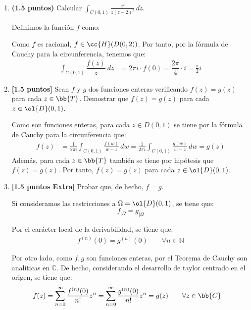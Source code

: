 \documentclass[12pt]{article}
\begin{document}
    \begin{ejercicio}~
        \begin{enumerate}
            \item \textbf{(1.5 puntos)} Calcular $\displaystyle \int_{C(0,1)} \frac{e^z}{z(z - 2)^2} \, dz$.
            
            Definimos la función $f$ como:

            Como $f$ es racional, $f\in \cc{H}(D(0,2))$. Por tanto, por la fórmula de Cauchy para la circunferencia, tenemos que:
            \begin{align*}
                \int_{C(0,1)} \dfrac{f(z)}{z}\ dz &= 2\pi i \cdot f(0)=\dfrac{2\pi}{4}\cdot i = \frac{\pi}{2} i
            \end{align*}
            \item \textbf{[1.5 puntos]} Sean $f$ y $g$ dos funciones enteras verificando $f(z) = g(z)$ para cada $z \in \bb{T}$. Demostrar que $f(z) = g(z)$ para cada $z \in \ol{D}(0, 1)$.
            
            Como son funciones enteras, para cada $z\in D(0,1)$ se tiene por la fórmula de Cauchy para la circunferencia que:
            \begin{align*}
                f(z) &= \frac{1}{2\pi i} \int_{C(0,1)} \frac{f(w)}{w-z} \, dw
                = \frac{1}{2\pi i} \int_{C(0,1)} \frac{g(w)}{w-z} \, dw
                = g(z)
            \end{align*}
            Además, para cada $z\in \bb{T}$ también se tiene por hipótesis que $f(z)=g(z)$. Por tanto, $f(z)=g(z)$ para cada $z\in \ol{D}(0,1)$.
            \item \textbf{[1.5 puntos Extra]} Probar que, de hecho, $f = g$.
            
            Si consideramos las restricciones a $\Omega=\ol{D}(0,1)$, se tiene que:
            \begin{equation*}
                f_{\big| \Omega} = g_{\big| \Omega}
            \end{equation*}

            Por el carácter local de la derivabilidad, se tiene que:
            \begin{align*}
                f^{(n)}(0) = g^{(n)}(0) \qquad \forall n\in \mathbb{N}
            \end{align*}

            Por otro lado, como $f,g$ son funciones enteras, por el Teorema de Cauchy son analíticas en $\mathbb{C}$. De hecho, considerando el desarrollo de taylor centrado en el origen, se tiene que:
            \begin{align*}
                f(z) &= \sum_{n=0}^{\infty} \frac{f^{(n)}(0)}{n!} z^n = \sum_{n=0}^{\infty} \frac{g^{(n)}(0)}{n!} z^n = g(z)\qquad \forall z\in \bb{C}
            \end{align*}
        \end{enumerate}        
    \end{ejercicio}
\end{document}

